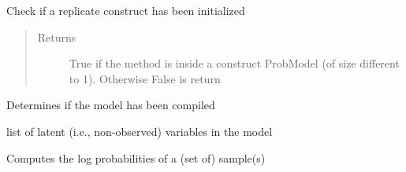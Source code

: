 \documentclass[letterpaper,10pt,english]{sphinxmanual}
\begin{document}
\begin{fulllineitems}

\begin{fulllineitems}
\label{\detokenize{modules/inferpy.models:inferpy.models.prob_model.ProbModel.is_active}}
Check if a replicate construct has been initialized
\begin{quote}\begin{description}
\item[{Returns}] \leavevmode
True if the method is inside a construct ProbModel (of size different to 1).
Otherwise False is return

\end{description}\end{quote}

\end{fulllineitems}


\begin{fulllineitems}
\label{\detokenize{modules/inferpy.models:inferpy.models.prob_model.ProbModel.is_compiled}}
Determines if the model has been compiled

\end{fulllineitems}


\begin{fulllineitems}
\label{\detokenize{modules/inferpy.models:inferpy.models.prob_model.ProbModel.latent_vars}}
list of latent (i.e., non-observed) variables in the model

\end{fulllineitems}


\begin{fulllineitems}
\label{\detokenize{modules/inferpy.models:inferpy.models.prob_model.ProbModel.log_prob}}
Computes the log probabilities of a (set of) sample(s)

\end{fulllineitems}



\end{fulllineitems}
\end{document}
